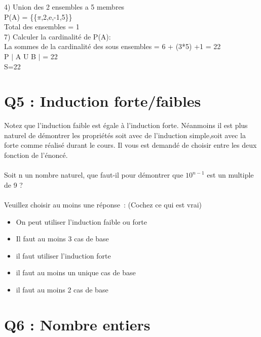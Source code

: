 4) Union des 2 ensembles a 5 membres \\

P(A) = \{\{$\pi$,2,e,-1,5\}\} \\

Total des ensembles = 1 \\

7) Calculer la cardinalité de P(A):\\

La sommes de la cardinalité des sous ensembles = 6 + (3*5) +1 = 22\\

P $|$ A U B $|$ = 22 \\

S=22 \\


\newpage
\section{Q5 : Induction forte/faibles}

\vspace{5mm} %

Notez que l’induction faible est égale à l’induction forte. Néanmoins il est plus naturel de démontrer les propriétés soit avec de l’induction simple,soit avec la forte comme réalisé durant le cours. Il vous est demandé de choisir entre les deux fonction de l’énoncé.\\ \\
Soit n un nombre naturel, que faut-il pour démontrer que $10^{n-1}$ est un multiple de 9 ? \\ \\
Veuillez choisir au moins une réponse : (Cochez ce qui est vrai)\\

\begin{itemize}[label=$\square$]
\item On peut utiliser l’induction faible ou forte
\item Il faut au moins 3 cas de base
\item il faut utiliser l’induction forte
\item il faut au moins un unique cas de base
\item il faut au moins 2 cas de base
\end{itemize}

\vspace{5mm} %

\section{Q6 : Nombre entiers}

